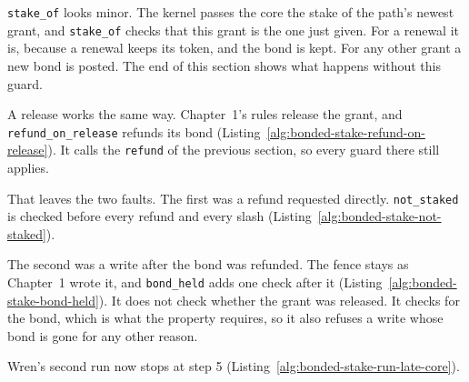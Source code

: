 
\texttt{stake\_of} looks minor. The kernel passes the core the stake of
the path's newest grant, and \texttt{stake\_of} checks that this grant is
the one just given. For a renewal it is, because a renewal keeps its
token, and the bond is kept. For any other grant a new bond is posted. The
end of this section shows what happens without this guard.

A release works the same way. Chapter~1's rules release the grant, and
\texttt{refund\_on\_release} refunds its bond
(Listing~\ref{alg:bonded-stake-refund-on-release}). It calls the
\texttt{refund} of the previous section, so every guard there still
applies.


That leaves the two faults. The first was a refund requested directly.
\texttt{not\_staked} is checked before every refund and every slash
(Listing~\ref{alg:bonded-stake-not-staked}).


The second was a write after the bond was refunded. The fence stays as
Chapter~1 wrote it, and \texttt{bond\_held} adds one check after it
(Listing~\ref{alg:bonded-stake-bond-held}). It does not check whether the
grant was released. It checks for the bond, which is what the property
requires, so it also refuses a write whose bond is gone for any other
reason.


Wren's second run now stops at step 5
(Listing~\ref{alg:bonded-stake-run-late-core}).



